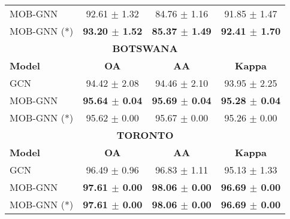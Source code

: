 \begin{table}[h]
\begin{minipage}{0.49\textwidth}
\begin{tabular}{|lccc|}
MOB-GNN & 92.61 $\pm$ 1.32 & 84.76 $\pm$ 1.16 & 91.85 $\pm$ 1.47 \\
MOB-GNN (*) & \textbf{93.20 $\pm$ 1.52} & \textbf{85.37 $\pm$ 1.49} & \textbf{92.41 $\pm$ 1.70} \\
\hline
\multicolumn{4}{|c|}{\textbf{BOTSWANA}} \\
\hline
\textbf{Model} & \textbf{OA} & \textbf{AA} & \textbf{Kappa} \\
\hline
GCN & 94.42 $\pm$ 2.08 & 94.46 $\pm$ 2.10 & 93.95 $\pm$ 2.25 \\
MOB-GNN & \textbf{95.64 $\pm$ 0.04} & \textbf{95.69 $\pm$ 0.04} & \textbf{95.28 $\pm$ 0.04} \\
MOB-GNN (*) & 95.62 $\pm$ 0.00 & 95.67 $\pm$ 0.00 & 95.26 $\pm$ 0.00 \\
\hline
\multicolumn{4}{|c|}{\textbf{TORONTO}} \\
\hline
\textbf{Model} & \textbf{OA} & \textbf{AA} & \textbf{Kappa} \\
\hline
GCN & 96.49 $\pm$ 0.96 & 96.83 $\pm$ 1.11 & 95.13 $\pm$ 1.33 \\
MOB-GNN & \textbf{97.61 $\pm$ 0.00} & \textbf{98.06 $\pm$ 0.00} & \textbf{96.69 $\pm$ 0.00} \\
MOB-GNN (*) & \textbf{97.61 $\pm$ 0.00} & \textbf{98.06 $\pm$ 0.00} & \textbf{96.69 $\pm$ 0.00} \\
\hline
\end{tabular}
    \end{minipage}
    \begin{minipage}{0.49\textwidth}


\end{minipage}
\end{table}

